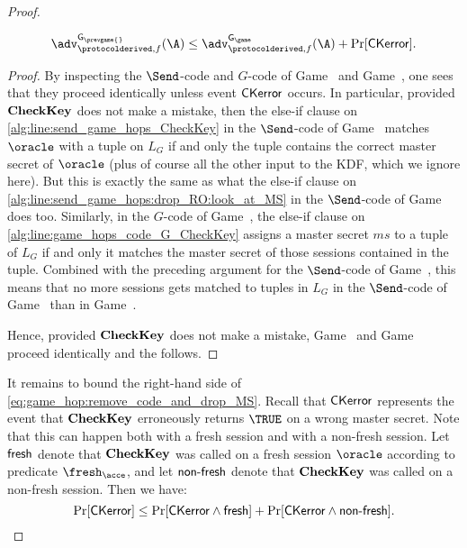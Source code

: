 \begin{proof}
\begin{claim}\label{claim:EAP-TLS:introduce_CheckKey}
\begin{align}\label{eq:game_hop:remove_code_and_drop_MS}
	\adv_{\protocolderived,f}^{\mathsf{G_{\prevgame{}}}}(\A) 
		\leq \adv_{\protocolderived,f}^{\mathsf{G_\game}}(\A) 
		+ \Pr[\CKerror] .
\end{align} 
\end{claim}

\begin{proof}
By inspecting the $\Send$-code and $G$-code of Game~\prevgame{} and Game~\game{},
one sees that they proceed identically unless event $\mathsf{CKerror}$ occurs.
In particular,
provided $\mathbf{CheckKey}$ does not make a mistake,
then the else-if clause on \cref{alg:line:send_game_hops_CheckKey} in the $\Send$-code of Game~\game{} matches $\oracle$ with a tuple on $L_G$ if and only the tuple contains the correct master secret of $\oracle$ (plus of course all the other input to the KDF, which we ignore here).
But this is exactly the same as what the else-if clause on \cref{alg:line:send_game_hops:drop_RO:look_at_MS} in the $\Send$-code of Game~\prevgame{} does too.
Similarly,
in the $G$-code of Game~\game{},
the else-if clause on \cref{alg:line:game_hops_code_G_CheckKey} assigns a master secret $ms$ to a tuple of $L_G$ if and only it matches the master secret of those sessions contained in the tuple.
Combined with the preceding argument for the $\Send$-code of Game~\game{},
this means that no more sessions gets matched to tuples in $L_G$ in the $\Send$-code of Game~\game{} than in Game~\prevgame{}.

Hence, 
provided $\mathbf{CheckKey}$ does not make a mistake,
Game~\prevgame{} and Game~\game{} proceed identically
and the  follows.
\end{proof}




It remains to bound the right-hand side of \cref{eq:game_hop:remove_code_and_drop_MS}.
Recall that $\mathsf{CKerror}$ represents the event that $\mathbf{CheckKey}$ erroneously returns $\TRUE$ on a wrong master secret.
Note that this can happen both with a fresh session and with a non-fresh session.
Let $\mathsf{fresh}$ denote that $\mathbf{CheckKey}$ was called on a fresh session $\oracle$ according to predicate $\fresh_{\acce}$,
and let $\operatorname{\mathsf{non-fresh}}$ denote that $\mathbf{CheckKey}$ was called on a non-fresh session.
Then we have:
\begin{equation}
\Pr[\mathsf{CKerror}] \leq \Pr[\mathsf{CKerror} \land \mathsf{fresh}] + \Pr[\mathsf{CKerror} \land \operatorname{\mathsf{non-fresh}}] .
\end{equation}


\end{proof}

